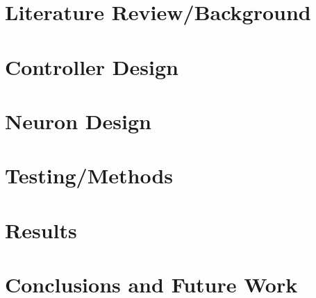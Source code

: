 \documentclass[12pt, letterpaper, oneside, onecolumn]{report} %
\begin{document}


\chapter{Literature Review/Background}
\label{chap:lit_review}


\chapter{Controller Design}
\label{chap:controller_design}


\chapter{Neuron Design}
\label{chap:neuron_design}


\chapter{Testing/Methods}
\label{chap:methods}


\chapter{Results}
\label{chap:results}


\chapter{Conclusions and Future Work}
\label{chap:conclusion}


\newpage
\label{chap:references}
\printbibliography[heading=bibintoc, title={Bibliography}]

% 

% 
\end{document}
